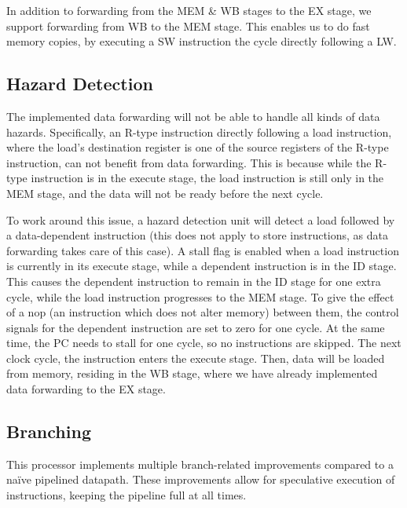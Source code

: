 In addition to forwarding from the MEM \& WB stages to the EX stage, we support forwarding from WB to the MEM stage.
This enables us to do fast memory copies, by executing a SW instruction the cycle directly following a LW.

\subsection {Hazard Detection}
The implemented data forwarding will not be able to handle all kinds of data hazards.
Specifically, an R-type instruction directly following a load instruction, where the load's destination register is one of the source registers of the R-type instruction, can not benefit from data forwarding.
This is because while the R-type instruction is in the execute stage, the load instruction is still only in the MEM stage, and the data will not be ready before the next cycle.

To work around this issue, a hazard detection unit will detect a load followed by a data-dependent instruction (this does not apply to store instructions, as data forwarding takes care of this case).
A stall flag is enabled when a load instruction is currently in its execute stage, while a dependent instruction is in the ID stage.
This causes the dependent instruction to remain in the ID stage for one extra cycle, while the load instruction progresses to the MEM stage.
To give the effect of a nop (an instruction which does not alter memory) between them, the control signals for the dependent instruction are set to zero for one cycle.
At the same time, the PC needs to stall for one cycle, so no instructions are skipped.
The next clock cycle, the instruction enters the execute stage.
Then, data will be loaded from memory, residing in the WB stage, where we have already implemented data forwarding to the EX stage.

\subsection{Branching}

This processor implements multiple branch-related improvements compared to a naïve pipelined datapath. These improvements allow for speculative execution of instructions, keeping the pipeline full at all times.

